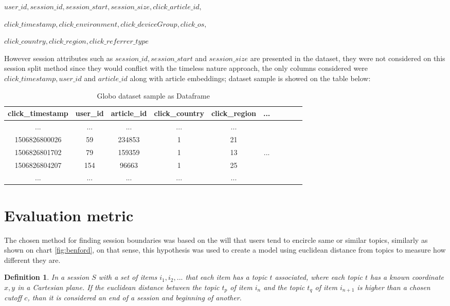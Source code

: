 \documentclass[ecp,tc,english]{iiufrgs}
\newtheorem{definition}{Definition}
\begin{document}
    \(user\_id, session\_id, session\_start, session\_size, click\_article\_id,\) 
    
    \(click\_timestamp, click\_environment, click\_deviceGroup, click\_os, \)
    
    \(click\_country, click\_region, click\_referrer\_type \)

    However session attributes such as \(session\_id, session\_start\) and \(session\_size\) are presented in the dataset, they were not considered on this session split method since they would conflict with the timeless nature approach, the only columns considered were \(click\_timestamp, user\_id\) and \(article\_id\) along with article embeddings; dataset sample is showed on the table below:
    
    \begin{table}[H]
        \centering
        \begin{tabular}{ |c|c|c|c|c|c|c|c|c|c| } 
            \hline
            click\_timestamp & user\_id & article\_id & click\_country & click\_region & ... \\
            \hline 
            ... & ...  & ...  & ...  & ... & \\
            1506826800026 & 59 & 234853 & 1 & 21 & \\ 
            1506826801702 & 79 & 159359 & 1 & 13 & ...\\ 
            1506826804207 & 154 & 96663 & 1 & 25 & \\ 
            ... & ...  & ...  & ...  & ... & \\
            \hline
        \end{tabular}
        \caption{Globo dataset sample as Dataframe}
        \label{tab:globo_dataset_sample}
    \end{table}


    \section{Evaluation metric} \label{euclidean_distance_heuristic}
    The chosen method for finding session boundaries was based on the will that users tend to encircle same or similar topics, similarly as shown on chart \ref{fig:benford}, on that sense, this hypothesis was used to create a model using euclidean distance from topics to measure how different they are.
    
    \begin{definition}
    In a session \(S\) with a set of items \(i_{1}, i_{2}, ...\) that each item has a \textit{topic} \(t\) associated, where each \textit{topic} \(t\) has a known coordinate \(x, y\) in a Cartesian plane.
    If the euclidean distance between the topic \(t_{p}\) of item \(i_{n}\) and the topic \(t_{q}\) of item \(i_{n+1}\) is higher than a chosen cutoff \(c\), than it is considered an end of a session and beginning of another.
    \label{euclidean_distance_threshold_definition}
    \end{definition}
\end{document}
